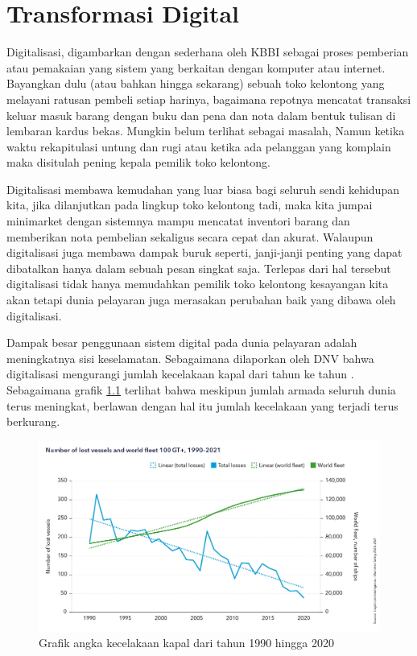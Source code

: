 \chapter{Transformasi Digital}
\label{ch:transformasi-digital}

Digitalisasi, digambarkan dengan sederhana oleh KBBI sebagai proses pemberian atau pemakaian yang sistem yang berkaitan dengan komputer atau internet. Bayangkan dulu (atau bahkan hingga sekarang) sebuah toko kelontong yang melayani ratusan pembeli setiap harinya, bagaimana repotnya mencatat transaksi keluar masuk barang dengan buku dan pena dan nota dalam bentuk tulisan di lembaran kardus bekas. Mungkin belum terlihat sebagai masalah, Namun ketika waktu rekapitulasi untung dan rugi atau ketika ada pelanggan yang komplain maka disitulah pening kepala pemilik toko kelontong.

Digitalisasi membawa kemudahan yang luar biasa bagi seluruh sendi kehidupan kita, jika dilanjutkan pada lingkup toko kelontong tadi, maka kita jumpai minimarket dengan sistemnya mampu mencatat inventori barang dan memberikan nota pembelian sekaligus secara cepat dan akurat. Walaupun digitalisasi juga membawa dampak buruk seperti, janji-janji penting yang dapat dibatalkan hanya dalam sebuah pesan singkat saja. Terlepas dari hal tersebut digitalisasi tidak hanya memudahkan pemilik toko kelontong kesayangan kita akan tetapi dunia pelayaran juga merasakan perubahan baik yang dibawa oleh digitalisasi.

Dampak besar penggunaan sistem digital pada dunia pelayaran adalah meningkatnya sisi keselamatan. Sebagaimana dilaporkan oleh DNV bahwa digitalisasi mengurangi jumlah kecelakaan kapal dari tahun ke tahun \citep{Valderhaug_Goksoyr_2022}. Sebagaimana grafik \ref{fig:pengurangan-kecelakaan-kapal} terlihat bahwa meskipun jumlah armada seluruh dunia terus meningkat, berlawan dengan hal itu jumlah kecelakaan yang terjadi terus berkurang.
\begin{figure}[!htbp]
    \centering
    \includegraphics[width=0.65\linewidth]{images/number_of_lost_vessels.jpg.jpg}
    \caption{Grafik angka kecelakaan kapal dari tahun 1990 hingga 2020}
    \label{fig:pengurangan-kecelakaan-kapal}
\end{figure}


